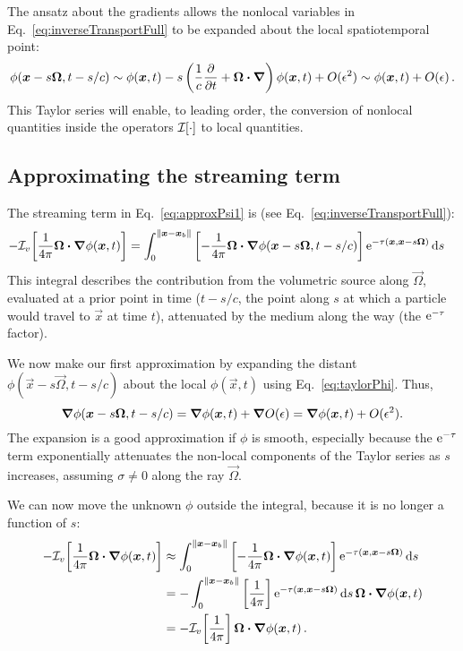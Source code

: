 The ansatz about the gradients allows the nonlocal variables in
Eq.~\eqref{eq:inverseTransportFull} to be expanded about
the local spatiotemporal point:
\begin{equation} \label{eq:taylorPhi}
  \phi(\bm{x} - s \bm{\Omega}, t-s/c)
  \sim \phi(\bm{x},t) - s \left( \frac{1}{c} \frac{\partial }{\partial t} + \bm{\Omega} \bm{\cdot}
  \bm{\nabla}  \right) \phi (\bm{x}, t) + O(\epsilon^2) \sim \phi(\bm{x},t) +
  O(\epsilon) \,.
\end{equation}
This Taylor series will enable, to leading order, the conversion of nonlocal
quantities inside the operators $\mathcal{I}_{}\!\left[\cdot\right]$ to local quantities.

\subsection{Approximating the streaming term}
The streaming term in Eq.~\eqref{eq:approxPsi1} is (see
Eq.~\eqref{eq:inverseTransportFull}):
\begin{align*}
- \mathcal{I}_{v}\!\left[\frac{1}{4\pi} \bm{\Omega}\bm{\cdot} \bm{\nabla} \phi(\bm{x}, t)\right]
  &= \int_{0}^{\left\| \bm{x} - \bm{x}_b \right\|}
    \left[ -\frac1{4\pi}\bm{\Omega}\bm{\cdot} \bm{\nabla} \phi(\bm{x} - s \bm{\Omega},
    t-s/c)
    \right]
    \mathop{}\!\mathrm{e}^{ -\tau(\bm{x}, \bm{x} - s \bm{\Omega})}
    \mathop{}\!\mathrm{d} s
\end{align*}
This integral describes the contribution from the volumetric source  along
$\vec{\Omega}$, evaluated at a prior
point in time ($t-s/c$, the point along $s$ at which a particle would travel
to $\vec{x}$ at time $t$), attenuated by the medium along the way (the
$\mathop{}\!\mathrm{e}^{ -\tau }$ factor).

We now make our first approximation by expanding the distant $\phi(\vec{x} - s
\vec{\Omega}, t-s/c)$ about the local $\phi(\vec{x}, t)$ using
Eq.~\eqref{eq:taylorPhi}. Thus,
\begin{equation*}
  \bm{\nabla} \phi(\bm{x} - s \bm{\Omega}, t-s/c)
  = \bm{\nabla} \phi(\bm{x}, t) + \bm{\nabla} O(\epsilon)
  = \bm{\nabla} \phi(\bm{x}, t) + O(\epsilon^2).
\end{equation*}
The expansion is a good approximation if $\phi$ is smooth, especially because the
$\mathop{}\!\mathrm{e}^{ -\tau }$ term exponentially attenuates the non-local components of the
Taylor series as $s$ increases, assuming $\sigma\ne 0$ along the ray
$\vec{\Omega}$.

We can now move the unknown $\phi$ outside the integral,
because it is no longer a function of $s$:
\begin{align}\nonumber
- \mathcal{I}_{v}\!\left[\frac{1}{4\pi} \bm{\Omega}\bm{\cdot} \bm{\nabla} \phi(\bm{x}, t)\right]
  &\approx \int_{0}^{\left\| \bm{x} - \bm{x}_b \right\|}
    \left[ -\frac1{4\pi}\bm{\Omega}\bm{\cdot} \bm{\nabla} \phi(\bm{x},t) \right]
    \mathop{}\!\mathrm{e}^{ -\tau(\bm{x}, \bm{x} - s \bm{\Omega})}
    \mathop{}\!\mathrm{d} s
  \\\nonumber
  &= - \int_{0}^{\left\| \bm{x} - \bm{x}_b \right\|}
    \left[ \frac1{4\pi}\right]
    \mathop{}\!\mathrm{e}^{ -\tau(\bm{x}, \bm{x} - s \bm{\Omega})} \mathop{}\!\mathrm{d} s \,
    \bm{\Omega}\bm{\cdot} \bm{\nabla} \phi(\bm{x},t)
  \\\label{eq:streamingApprox}
  &= - \mathcal{I}_{v}\!\left[ \frac1{4\pi} \right] \bm{\Omega}\bm{\cdot} \bm{\nabla} \phi(\bm{x},t)
  \,.
\end{align}

